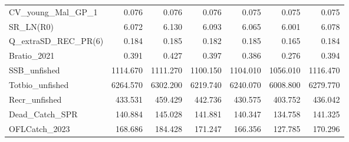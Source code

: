 \documentclass[11pt,
  english,
]{article}
\begin{document}
\begin{landscape}
\begin{table}
\begin{tabular}[t]{lrrrrrr}
CV\_young\_Mal\_GP\_1 & 0.076 & 0.076 & 0.076 & 0.075 & 0.075 & 0.075\\
SR\_LN(R0) & 6.072 & 6.130 & 6.093 & 6.065 & 6.001 & 6.078\\
Q\_extraSD\_REC\_PR(6) & 0.184 & 0.185 & 0.182 & 0.185 & 0.165 & 0.184\\
Bratio\_2021 & 0.391 & 0.427 & 0.397 & 0.386 & 0.276 & 0.394\\
SSB\_unfished & 1114.670 & 1111.270 & 1100.150 & 1104.010 & 1056.010 & 1116.470\\
Totbio\_unfished & 6264.570 & 6302.200 & 6219.740 & 6240.070 & 6008.800 & 6279.770\\
Recr\_unfished & 433.531 & 459.429 & 442.736 & 430.575 & 403.752 & 436.042\\
Dead\_Catch\_SPR & 140.884 & 145.028 & 141.881 & 140.347 & 134.758 & 141.325\\
OFLCatch\_2023 & 168.686 & 184.428 & 171.247 & 166.356 & 127.785 & 170.296\\
\bottomrule
\end{tabular}
\end{table}
\end{landscape}
\end{document}
